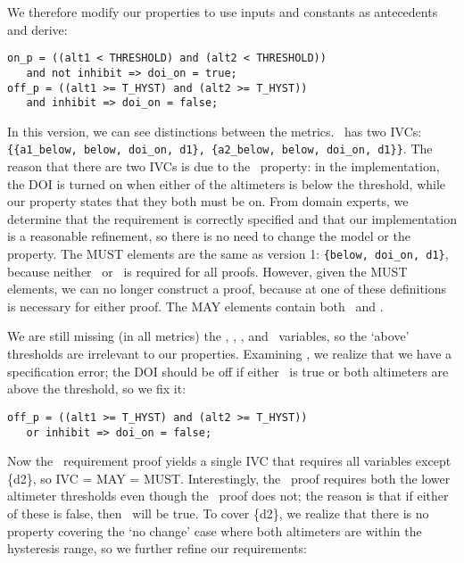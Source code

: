 We therefore modify our properties to use inputs and constants as antecedents and derive:
{\smaller
\begin{verbatim}
on_p = ((alt1 < THRESHOLD) and (alt2 < THRESHOLD))
   and not inhibit => doi_on = true;
off_p = ((alt1 >= T_HYST) and (alt2 >= T_HYST))
   and inhibit => doi_on = false;
\end{verbatim}
}

\noindent In this version, we can see distinctions between the metrics.  \allp\ has two IVCs: \texttt{\{\{a1\_below, below, doi\_on, d1\}, \{a2\_below, below, doi\_on, d1\}\}}.  The reason that there are two IVCs is due to the \onp\ property: in the implementation, the DOI is turned on when either of the altimeters is below the threshold, while our property states that they both must be on.
From domain experts, we determine that the requirement is correctly specified and that our implementation is a reasonable refinement, so there is no need to change the model or the property.  The MUST elements are the same as version 1: \texttt{\{below, doi\_on, d1\}}, because neither \aonebelow\ or \atwobelow\ is required for all proofs.  However, given the MUST elements, we can no longer construct a proof, because at one of these definitions is necessary for either proof.  The MAY elements contain both \aonebelow\ and \atwobelow.

We are still missing (in all metrics) the \abovehyst, \aoneabove, \atwoabove, and \dtwo\ variables, so the `above' thresholds are irrelevant to our properties.  Examining \offp, we realize that we have a specification error; the DOI should be off if either \inhibit\ is true or both altimeters are above the threshold, so we fix it:

{\smaller
\begin{verbatim}
off_p = ((alt1 >= T_HYST) and (alt2 >= T_HYST))
   or inhibit => doi_on = false;
\end{verbatim}
}

\noindent Now the \allp\ requirement proof yields a single IVC that requires all variables except \{d2\}, so IVC = MAY = MUST.  Interestingly, the \offp\ proof requires both the lower altimeter thresholds even though the \onp\ proof does not; the reason is that if either of these is false, then \doion\ will be true.  To cover \{d2\}, we realize that there is no property covering the `no change' case where both altimeters are within the hysteresis range, so we further refine our requirements:

